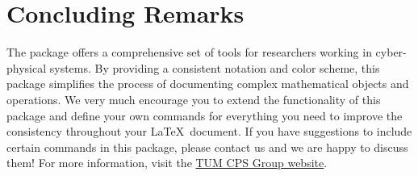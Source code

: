 \documentclass{article}
\begin{document}
\section{Concluding Remarks}
The \texttt{\CORAMACSname} package offers a comprehensive set of tools for researchers working in cyber-physical systems.
By providing a consistent notation and color scheme, this package simplifies the process of documenting complex mathematical objects and operations.
We very much encourage you to extend the functionality of this package and define your own commands for everything you need to improve the consistency throughout your \LaTeX\ document.
If you have suggestions to include certain commands in this package, please contact us and we are happy to discuss them!
For more information, visit the \href{https://www.ce.cit.tum.de/cps}{TUM CPS Group website}.
\end{document}
